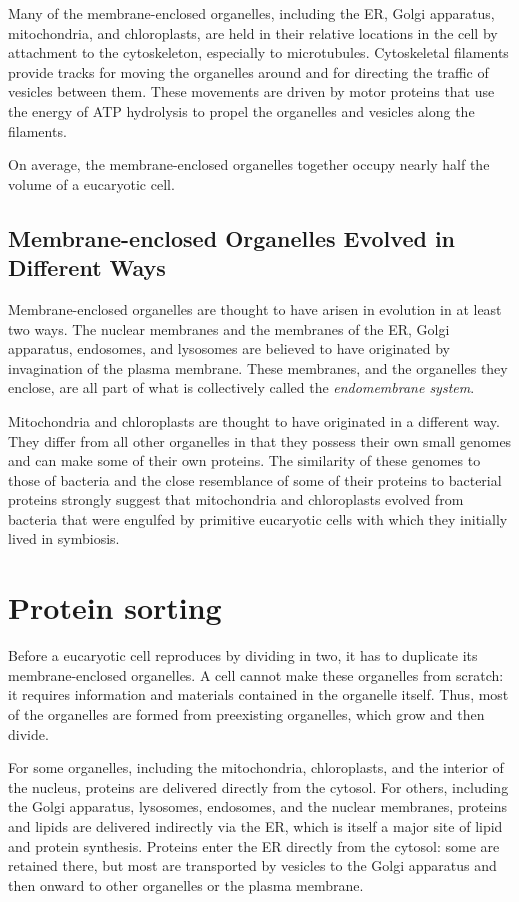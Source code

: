 Many of the membrane-enclosed organelles, including the ER, Golgi apparatus, 
mitochondria, and chloroplasts, are held in their relative locations
in the cell by attachment to the cytoskeleton, especially to microtubules.
Cytoskeletal filaments provide tracks for moving the organelles around
and for directing the traffic of vesicles between them. These movements
are driven by motor proteins that use the energy of ATP hydrolysis to
propel the organelles and vesicles along the filaments.

On average, the membrane-enclosed organelles together occupy nearly
half the volume of a eucaryotic cell.

\subsection{Membrane-enclosed Organelles Evolved in Different Ways}

Membrane-enclosed organelles are thought to have arisen in evolution
in at least two ways. The nuclear membranes and the membranes of the
ER, Golgi apparatus, endosomes, and lysosomes are believed to have
originated by invagination of the plasma membrane. These
membranes, and the organelles they enclose, are all part of what is 
collectively called the \textit{endomembrane system}.

Mitochondria and chloroplasts are thought to have originated in a different 
way. They differ from all other organelles in that they possess their
own small genomes and can make some of their own proteins. 
The similarity of these genomes to those of bacteria
and the close resemblance of some of their proteins to bacterial proteins
strongly suggest that mitochondria and chloroplasts evolved from bacteria 
that were engulfed by primitive eucaryotic cells with which they
initially lived in symbiosis.

\section{Protein sorting}

Before a eucaryotic cell reproduces by dividing in two, it has to duplicate
its membrane-enclosed organelles. A cell cannot make these organelles
from scratch: it requires information and materials contained in the
organelle itself. Thus, most of the organelles are formed from preexisting
organelles, which grow and then divide.

For some organelles, including the mitochondria, chloroplasts, and the
interior of the nucleus, proteins are delivered directly from the cytosol.
For others, including the Golgi apparatus, lysosomes, endosomes, and
the nuclear membranes, proteins and lipids are delivered indirectly via
the ER, which is itself a major site of lipid and protein synthesis. Proteins
enter the ER directly from the cytosol: some are retained there, but most
are transported by vesicles to the Golgi apparatus and then onward to
other organelles or the plasma membrane.

